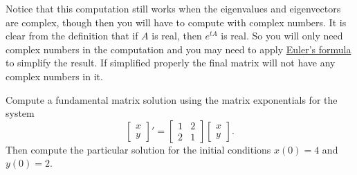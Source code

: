 \documentclass[12pt]{book}
\begin{document}
Notice that this computation still works when the eigenvalues and
eigenvectors are complex, though then you will have to compute with complex
numbers.  It is clear from the definition that if $A$ is real,
then $e^{tA}$ is real.  So you will only need complex numbers in the
computation and you may need to apply
\hyperref[eulersformula]{Euler's formula} to simplify the
result.  If simplified properly the final matrix will not have any complex
numbers in it.

\begin{example}
Compute a fundamental matrix solution using the matrix exponentials
for the system
\begin{equation*}
\begin{bmatrix}
x \\ y
\end{bmatrix} '
=
\begin{bmatrix}
1 & 2 \\
2 & 1
\end{bmatrix}
\begin{bmatrix}
x \\ y
\end{bmatrix} .
\end{equation*}
Then compute the particular solution for the initial conditions
$x(0) = 4$ and $y(0) = 2$.


\end{example}
\end{document}

